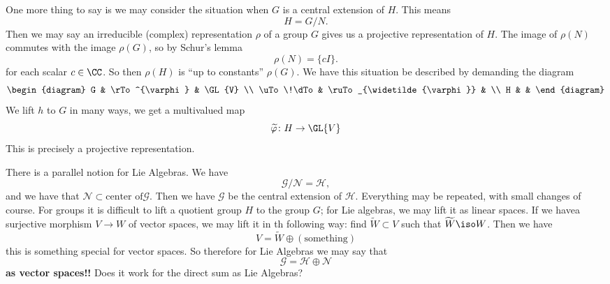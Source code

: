 One more thing to say is we may consider the situation when $G$
is a central extension of $H$. This means
\begin{equation}
H=G/N.
\end{equation}
Then we may say an irreducible (complex) representation $\rho$ of
a group $G$ gives us a projective representation of $H$. The
image of $\rho(N)$ commutes with the image $\rho(G)$, so by
Schur's lemma 
\begin{equation}
\rho(N) = \{cI\}.
\end{equation}
for each scalar $c\in\CC$. So then $\rho(H)$ is ``up to
constants'' $\rho(G)$. We have this situation be described by
demanding the diagram
\begin{equation}
\begin{diagram}
  G      & \rTo^{\varphi}              & \GL{V} \\
\uTo\!\dTo & \ruTo_{\widetilde{\varphi}} & \\
H        &                        &
\end{diagram}
\end{equation}
We lift $h$ to $G$ in many ways, we get a multivalued map
\begin{equation}
\widetilde{\varphi}\colon H\to\GL{V}
\end{equation}
This is precisely a projective representation.

There is a parallel notion for Lie Algebras. We have
\begin{equation}
\mathscr{G}/\mathscr{N}=\mathscr{H},
\end{equation}
and we have that $\mathscr{N}\subset\mbox{center of
}\mathscr{G}$. Then we have $\mathscr{G}$ be the central
extension of $\mathscr{H}$. Everything may be repeated, with
small changes of course. For groups it is difficult to lift a
quotient group $H$ to the group $G$; for Lie algebras, we may
lift it as linear spaces. If we havea surjective morphism $V\to W$
of vector spaces, we may lift it in th following way: find
$\widetilde{W}\subset V$ such that $\widetilde{W}\iso W$. Then we
have
\begin{equation}
V=\widetilde{W}\oplus(\mbox{something})
\end{equation}
this is something special for vector spaces. So therefore for Lie
Algebras we may say that 
\begin{equation}
\mathscr{G}=\mathscr{H}\oplus\mathscr{N}
\end{equation}
\textbf{as vector spaces!!} Does it work for the direct sum as
Lie Algebras?

